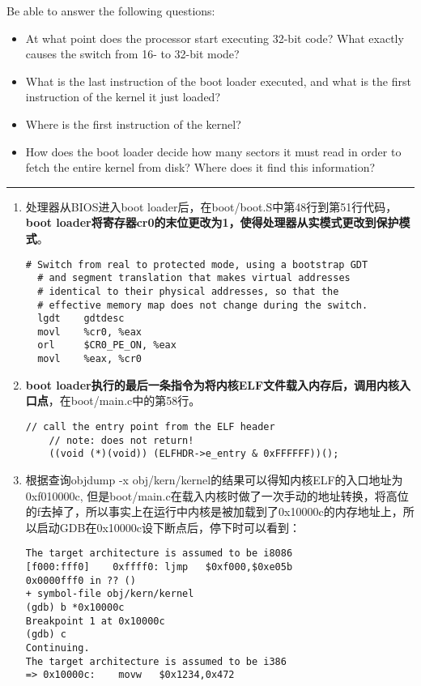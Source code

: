 \documentclass{article}
\newcommand{\highlight}[1]{{\bfseries \color{red}  #1}}
\begin{document}
\begin{CJK*}{UTF8}{gkai}
Be able to answer the following questions:

\begin{itemize}
\item{At what point does the processor start executing 32-bit code? What exactly causes the switch from 16- to 32-bit mode? }
\item{What is the last instruction of the boot loader executed, and what is the first instruction of the kernel it just loaded? }
\item{Where is the first instruction of the kernel?}
\item{How does the boot loader decide how many sectors it must read in order to fetch the entire kernel from disk? Where does it find this information? }
\end{itemize}

\hrule

\begin{enumerate}
\item{处理器从BIOS进入boot loader后，在boot/boot.S中第48行到第51行代码，\highlight{boot loader将寄存器cr0的末位更改为1，使得处理器从实模式更改到保护模式}。

\begin{lstlisting}[style=acode, firstnumber=44, title={\scriptsize \ttfamily \bfseries boot/boot.S}]
  # Switch from real to protected mode, using a bootstrap GDT
  # and segment translation that makes virtual addresses
  # identical to their physical addresses, so that the
  # effective memory map does not change during the switch.
  lgdt    gdtdesc
  movl    %cr0, %eax
  orl     $CR0_PE_ON, %eax
  movl    %eax, %cr0
\end{lstlisting}
}
\item{\highlight{boot loader执行的最后一条指令为将内核ELF文件载入内存后，调用内核入口点}，在boot/main.c中的第58行。
\begin{lstlisting}[style=ccode, firstnumber=56, title={\scriptsize \ttfamily \bfseries boot/main.c}]
    // call the entry point from the ELF header
    // note: does not return!
    ((void (*)(void)) (ELFHDR->e_entry & 0xFFFFFF))();
\end{lstlisting}
}

\item{根据查询objdump -x obj/kern/kernel的结果可以得知内核ELF的入口地址为0xf010000c, 但是boot/main.c在载入内核时做了一次手动的地址转换，将高位的f去掉了，所以事实上在运行中内核是被加载到了0x10000c的内存地址上，所以启动GDB在0x10000c设下断点后，停下时可以看到：

\begin{lstlisting}[style=console]
The target architecture is assumed to be i8086
[f000:fff0]    0xffff0:	ljmp   $0xf000,$0xe05b
0x0000fff0 in ?? ()
+ symbol-file obj/kern/kernel
(gdb) b *0x10000c
Breakpoint 1 at 0x10000c
(gdb) c
Continuing.
The target architecture is assumed to be i386
=> 0x10000c:	movw   $0x1234,0x472


\end{lstlisting}}
\end{enumerate}
\end{CJK*}
\end{document}
